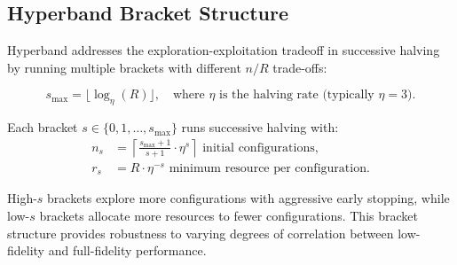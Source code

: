 \subsection{Hyperband Bracket Structure}

Hyperband addresses the exploration-exploitation tradeoff in successive halving by running multiple brackets with different $n/R$ trade-offs:

\begin{equation}
s_{\max} = \lfloor \log_\eta(R) \rfloor, \quad \text{where } \eta \text{ is the halving rate (typically } \eta = 3 \text{)}.
\end{equation}

Each bracket $s \in \{0, 1, \ldots, s_{\max}\}$ runs successive halving with:
\begin{align}
n_s &= \left\lceil \frac{s_{\max} + 1}{s + 1} \cdot \eta^s \right\rceil \text{ initial configurations}, \\
r_s &= R \cdot \eta^{-s} \text{ minimum resource per configuration}.
\end{align}

High-$s$ brackets explore more configurations with aggressive early stopping, while low-$s$ brackets allocate more resources to fewer configurations. This bracket structure provides robustness to varying degrees of correlation between low-fidelity and full-fidelity performance.

